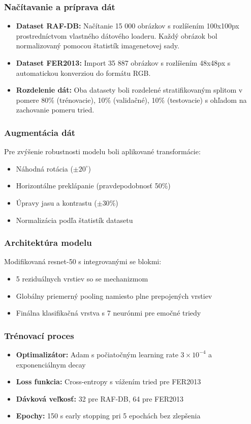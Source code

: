 \subsubsection{Načítavanie a príprava dát}
\begin{itemize}
\item \textbf{Dataset RAF-DB:} Načítanie 15 000 obrázkov s rozlíšením 100x100px prostredníctvom vlastného dátového loaderu. Každý obrázok bol normalizovaný pomocou štatistík imagenetovej sady.
\item \textbf{Dataset FER2013:} Import 35 887 obrázkov s rozlíšením 48x48px s automatickou konverziou do formátu RGB.
\item \textbf{Rozdelenie dát:} Oba datasety boli rozdelené stratifikovaným splitom v pomere 80\% (trénovacie), 10\% (validačné), 10\% (testovacie) s ohľadom na zachovanie pomeru tried.
\end{itemize}

\subsubsection{Augmentácia dát}
Pre zvýšenie robustnosti modelu boli aplikované transformácie:
\begin{itemize}
    \item Náhodná rotácia ($\pm 20^\circ$)
    \item Horizontálne preklápanie (pravdepodobnosť 50\%)
    \item Úpravy jasu a kontrastu ($\pm 30\%$)
    \item Normalizácia podľa štatistík datasetu
\end{itemize}

\subsubsection{Architektúra modelu}
Modifikovaná \gls{resnet}-50 s integrovanými \gls{se} blokmi:
\begin{itemize}
    \item 5 reziduálnych vrstiev so \gls{se} mechanizmom
    \item Globálny priemerný pooling namiesto plne prepojených vrstiev
    \item Finálna klasifikačná vrstva s 7 neurónmi pre emočné triedy
\end{itemize}

\subsubsection{Trénovací proces}
\begin{itemize}
    \item \textbf{Optimalizátor:} Adam s počiatočným learning rate $3 \times 10^{-4}$ a exponenciálnym decay
    \item \textbf{Loss funkcia:} Cross-entropy s vážením tried pre FER2013
    \item \textbf{Dávková veľkosť:} 32 pre RAF-DB, 64 pre FER2013
    \item \textbf{Epochy:} 150 s early stopping pri 5 epochách bez zlepšenia
\end{itemize}

